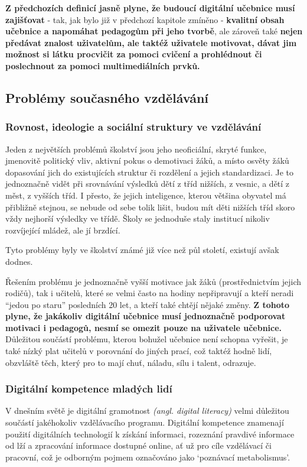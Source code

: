 \documentclass[12pt]{article}
\begin{document}
\textbf{Z předchozích definicí jasně plyne, že budoucí digitální učebnice musí zajišťovat}  - tak, jak bylo již v předchozí kapitole zmíněno - \textbf{kvalitní obsah učebnice a napomáhat pedagogům při jeho tvorbě}, ale zároveň také \textbf{nejen předávat znalost uživatelům, ale taktéž uživatele motivovat, dávat jim možnost si látku procvičit za pomoci cvičení a prohlédnout či poslechnout za pomoci multimediálních prvků.}

\newpage
\subsection{Problémy současného vzdělávání}
\subsubsection{Rovnost, ideologie a sociální struktury ve vzdělávání}

Jeden z největších problémů školství jsou jeho neoficiální, skryté funkce, jmenovitě politický vliv, aktivní pokus o demotivaci žáků, a místo osvěty žáků dopasování jich do existujících struktur či rozdělení a jejich standardizaci. Je to jednoznačně vidět při srovnávání výsledků dětí z tříd nižších, z vesnic, a dětí z měst, z vyšších tříd. I přesto, že jejich inteligence, kterou většina obyvatel má přibližně stejnou, se nebude od sebe tolik lišit, budou mít děti nižších tříd skoro vždy nejhorší výsledky ve třídě. Školy se jednoduše staly institucí nikoliv rozvíjející mládež, ale jí brzdící.

Tyto problémy byly ve školství známé již více než půl století,  existují avšak dodnes.

Řešením problému je jednoznačně vyšší motivace jak žáků (prostřednictvím jejich rodičů), tak i učitelů, které se velmi často na hodiny nepřipravují a kteří neradi \enquote{jedou po staru} posledních 20 let, a kteří také chtějí nějaké změny. \textbf{Z tohoto plyne, že jakákoliv digitální učebnice musí jednoznačně podporovat motivaci i pedagogů, nesmí se omezit pouze na uživatele učebnice.} \cite{WPPzmiana}  Důležitou součástí problému, kterou bohužel učebnice není schopna vyřešit, je také nízký plat učitelů v porovnání do jiných prací, což taktéž hodně lidí, obzvláště těch, který pro to mají chuť, náladu, sílu i talent, odrazuje. \cite{HrozinkaDva}

\subsubsection{Digitální kompetence mladých lidí}
V dnešním světě je digitální gramotnost \textit{(angl. digital literacy)} velmi důležitou součástí jakéhokoliv vzdělávacího programu. Digitální kompetence znamenají použití digitálních technologií k získání informaci, rozeznání pravdivé informace od lží a zpracování informace dostupné online, ať už pro cíle vzdělávací či pracovní, což je odborným pojmem označováno jako \enquote*{poznávací metabolismus}.
\end{document}
